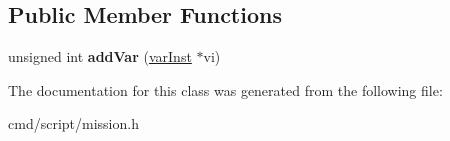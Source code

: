 \subsection*{Public Member Functions}
\begin{DoxyCompactItemize}
\item 
unsigned int {\bfseries add\+Var} (\hyperlink{classvarInst}{var\+Inst} $\ast$vi)\hypertarget{classvarInstVec_ac81a517b6636ee5db27f1f29c1541a06}{}\label{classvarInstVec_ac81a517b6636ee5db27f1f29c1541a06}

\end{DoxyCompactItemize}


The documentation for this class was generated from the following file\+:\begin{DoxyCompactItemize}
\item 
cmd/script/mission.\+h\end{DoxyCompactItemize}
